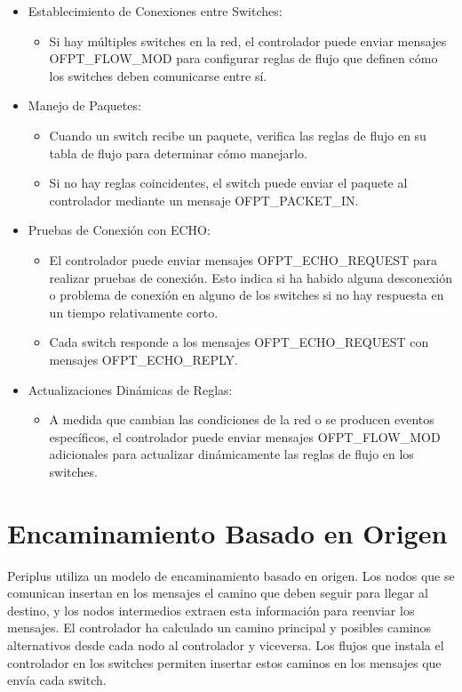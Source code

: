 \documentclass[a4paper, 12pt]{book}
\begin{document}
\begin{itemize}
		\item Establecimiento de Conexiones entre Switches:
		\begin{itemize}
			\item Si hay múltiples switches en la red, el controlador puede enviar mensajes
			OFPT\_FLOW\_MOD para configurar reglas de flujo que definen cómo los switches deben
			comunicarse entre sí.
		\end{itemize}
		
		\item Manejo de Paquetes:
		\begin{itemize}
			\item Cuando un switch recibe un paquete, verifica las reglas de flujo en su tabla de
			flujo para determinar cómo manejarlo.
			\item Si no hay reglas coincidentes, el switch puede enviar el paquete al controlador
			mediante un mensaje OFPT\_PACKET\_IN.
		\end{itemize}
		
		\item Pruebas de Conexión con ECHO:
		\begin{itemize}
			\item El controlador puede enviar mensajes OFPT\_ECHO\_REQUEST para realizar pruebas de conexión. Esto indica si ha habido alguna desconexión o problema de conexión en alguno de los switches si no hay respuesta en un tiempo relativamente corto.
			\item Cada switch responde a los mensajes OFPT\_ECHO\_REQUEST con mensajes OFPT\_ECHO\_REPLY.
		\end{itemize}
		
		\item Actualizaciones Dinámicas de Reglas:
		\begin{itemize}
			\item A medida que cambian las condiciones de la red o se producen eventos específicos,
			el controlador puede enviar mensajes OFPT\_FLOW\_MOD adicionales para actualizar
			dinámicamente las reglas de flujo en los switches.
		\end{itemize}
	\end{itemize}
	
	\section{Encaminamiento Basado en Origen}
	Periplus utiliza un modelo de encaminamiento basado en origen. Los nodos que se comunican insertan en los mensajes el camino que deben seguir para llegar al destino, y los nodos intermedios extraen esta información para reenviar los mensajes. El controlador ha calculado un camino principal y
	posibles caminos alternativos desde cada nodo al controlador y viceversa. Los flujos que instala el controlador en los switches
	permiten insertar estos	caminos	en los mensajes	que	envía cada switch.
	
\end{document}
